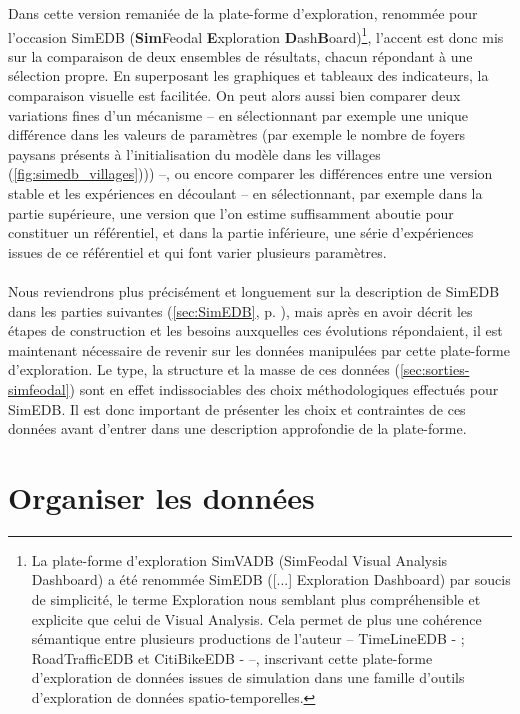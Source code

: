 	Dans cette version remaniée de la plate-forme d'exploration, renommée pour l'occasion SimEDB (\textbf{Sim}Feodal \textbf{E}xploration \textbf{D}ash\textbf{B}oard)\footnote{
		La plate-forme d'exploration SimVADB (SimFeodal Visual Analysis Dashboard) a été renommée SimEDB ([...] Exploration Dashboard) par soucis de simplicité, le terme \og Exploration\fg{} nous semblant plus compréhensible et explicite que celui de Visual Analysis. Cela permet de plus une cohérence sémantique entre plusieurs productions de l'auteur -- TimeLineEDB - \autocite{cura_timelineedb_2017}; RoadTrafficEDB et CitiBikeEDB - \autocite{cura_making_2017} --, inscrivant cette plate-forme d'exploration de données issues de simulation dans une \og famille \fg{} d'outils d'exploration de données spatio-temporelles.
	}, l'accent est donc mis sur la comparaison de deux ensembles de résultats, chacun répondant à une sélection propre.
	En superposant les graphiques et tableaux des indicateurs, la comparaison visuelle est facilitée.
	On peut alors aussi bien comparer deux variations fines d'un mécanisme -- en sélectionnant par exemple une unique différence dans les valeurs de paramètres (par exemple le nombre de foyers paysans présents à l'initialisation du modèle dans les villages (\cref{fig:simedb_villages}))) --, ou encore comparer les différences entre une version stable et les expériences en découlant -- en sélectionnant, par exemple dans la partie supérieure, une version que l'on estime suffisamment aboutie pour constituer un référentiel, et dans la partie inférieure, une série d'expériences issues de ce référentiel et qui font varier plusieurs paramètres.


	\paragraph*{}
	Nous reviendrons plus précisément et longuement sur la description de SimEDB dans les parties suivantes (\cref{sec:SimEDB}, p. \pageref{sec:SimEDB}), mais après en avoir décrit les étapes de construction et les besoins auxquelles ces évolutions répondaient, il est maintenant nécessaire de revenir sur les données manipulées par cette plate-forme d'exploration.
	Le type, la structure et la masse de ces données (\cref{sec:sorties-simfeodal}) sont en effet indissociables des choix méthodologiques effectués pour SimEDB.
	Il est donc important de présenter les choix et contraintes de ces données avant d'entrer dans une description approfondie de la plate-forme.

\clearpage
\section{Organiser les données}\label{sec:organiser-donnees}

